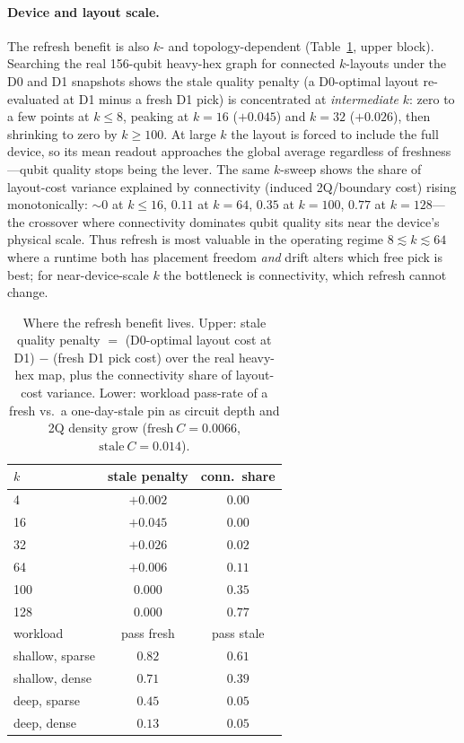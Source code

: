 \documentclass[journal,10pt,twocolumn]{IEEEtran}
\begin{document}
\paragraph{Device and layout scale.} The refresh benefit is also $k$- and topology-dependent (Table~\ref{tab:scope},
upper block). Searching the real 156-qubit heavy-hex graph for connected $k$-layouts under the D0 and D1
snapshots shows the stale quality penalty (a D0-optimal layout re-evaluated at D1 minus a fresh D1 pick) is
concentrated at \emph{intermediate} $k$: zero to a few points at $k{\le}8$, peaking at $k{=}16$ ($+0.045$) and
$k{=}32$ ($+0.026$), then shrinking to zero by $k{\ge}100$. At large $k$ the layout is forced to include the full
device, so its mean readout approaches the global average regardless of freshness---qubit quality stops being the
lever. The same $k$-sweep shows the share of layout-cost variance explained by connectivity (induced 2Q/boundary
cost) rising monotonically: $\sim0$ at $k{\le}16$, $0.11$ at $k{=}64$, $0.35$ at $k{=}100$, $0.77$ at
$k{=}128$---the crossover where connectivity dominates qubit quality sits near the device's physical scale. Thus
refresh is most valuable in the operating regime $8 \lesssim k \lesssim 64$ where a runtime both has placement
freedom \emph{and} drift alters which free pick is best; for near-device-scale $k$ the bottleneck is connectivity,
which refresh cannot change.

\begin{table}[t]
\caption{Where the refresh benefit lives. Upper: stale quality penalty $=$ (D0-optimal layout cost at D1) $-$ (fresh
D1 pick cost) over the real heavy-hex map, plus the connectivity share of layout-cost variance. Lower: workload
pass-rate of a fresh vs.\ a one-day-stale pin as circuit depth and 2Q density grow ($\mathrm{fresh}\ C{=}0.0066$,
$\mathrm{stale}\ C{=}0.014$).}
\label{tab:scope}
\centering
\footnotesize
\setlength{\tabcolsep}{3pt}
\begin{tabular}{@{}lcc@{}}
\toprule
$k$ & stale penalty & conn.\ share\\
\midrule
4 & $+0.002$ & $0.00$\\
16 & $+0.045$ & $0.00$\\
32 & $+0.026$ & $0.02$\\
64 & $+0.006$ & $0.11$\\
100 & $0.000$ & $0.35$\\
128 & $0.000$ & $0.77$\\
\midrule
workload & pass fresh & pass stale\\
\midrule
shallow, sparse & $0.82$ & $0.61$\\
shallow, dense & $0.71$ & $0.39$\\
deep, sparse & $0.45$ & $0.05$\\
deep, dense & $0.13$ & $0.05$\\
\bottomrule
\end{tabular}
\end{table}
\end{document}
